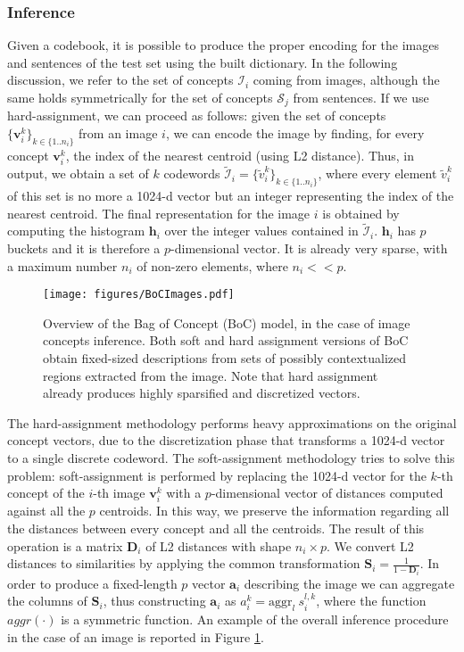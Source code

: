 \documentclass[conference]{IEEEtran}
\begin{document}
\subsubsection{Inference}
Given a codebook, it is possible to produce the proper encoding for the images and sentences of the test set using the built dictionary. 
In the following discussion, we refer to the set of concepts $\mathcal{I}_i$ coming from images, although the same holds symmetrically for the set of concepts $\mathcal{S}_j$ from sentences.
If we use hard-assignment, we can proceed as follows: given the set of concepts $\{\boldsymbol{v}_i^k\}_{k\in\{1..n_i\}}$ from an image $i$, we can encode the image by finding, for every concept $\boldsymbol{v}_i^k$, the index of the nearest centroid (using L2 distance). Thus, in output, we obtain a set of $k$ codewords $\tilde{\mathcal{I}}_i = \{\tilde{v}_i^k\}_{k\in\{1..n_i\}}$, where every element $\tilde{v}_i^k$ of this set is no more a 1024-d vector but an integer representing the index of the nearest centroid.
The final representation for the image $i$ is obtained by computing the histogram $\boldsymbol{h}_i$ over the integer values contained in $\tilde{\mathcal{I}}_i$.
$\boldsymbol{h}_i$ has $p$ buckets and it is therefore a $p$-dimensional vector. It is already very sparse, with a maximum number $n_i$ of non-zero elements, where $n_i << p$.

\begin{figure}[t]
    \centering
    \texttt{[image: figures/BoCImages.pdf]}
  \caption{Overview of the Bag of Concept (BoC) model, in the case of image concepts inference. Both soft and hard assignment versions of BoC obtain fixed-sized descriptions from sets of possibly contextualized regions extracted from the image. Note that hard assignment already produces highly sparsified and discretized vectors.}
  \label{fig:boc_details} 
\end{figure}

The hard-assignment methodology performs heavy approximations on the original concept vectors, due to the discretization phase that transforms a 1024-d vector to a single discrete codeword.
The soft-assignment methodology tries to solve this problem: soft-assignment is performed by replacing the 1024-d vector for the $k$-th concept of the $i$-th image  $\boldsymbol{v}_i^k$ with a $p$-dimensional vector of distances computed against all the $p$ centroids. In this way, we preserve the information regarding all the distances between every concept and all the centroids. 
The result of this operation is a matrix $\boldsymbol{D}_i$ of L2 distances with shape $n_i \times p$. We convert L2 distances to similarities by applying the common transformation $\boldsymbol{S}_i = \frac{1}{1 - \boldsymbol{D}_i}$.
In order to produce a fixed-length $p$ vector $\boldsymbol{a}_i$ describing the image we can aggregate the columns of $\boldsymbol{S}_i$, thus constructing $\boldsymbol{a}_i$ as $a_i^k = \text{aggr}_l \: s_i^{l,k}$, where the function $aggr(\cdot)$ is a symmetric function.
An example of the overall inference procedure in the case of an image is reported in Figure \ref{fig:boc_details}.
\end{document}

